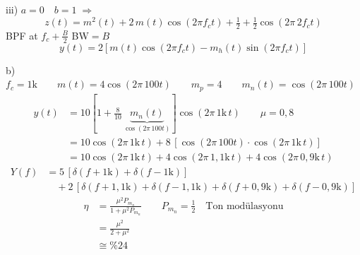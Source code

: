 \documentclass[11pt,a4paper]{article}
\begin{document}
\noindent iii) $a=0\quad b=1 \;\Rightarrow$
\[
z(t)=m^2(t)+2\,m(t)\cos(2\pi f_c t)+\tfrac12+\tfrac12\cos(2\pi\,2f_c t)
\]
BPF at $f_c+\tfrac{B}{2}$ \qquad BW$=B$
\[
y(t)=2\left[m(t)\cos(2\pi f_c t)-m_h(t)\sin(2\pi f_c t)\right]
\]

\noindent b) $f_c=1\mathrm{k}\qquad m(t)=4\cos(2\pi\,100t)\qquad m_p=4\qquad m_n(t)=\cos(2\pi\,100t)$
\begin{align*}
y(t) &= 10\left[1+\frac{8}{10}\,\underbrace{m_n(t)}_{\cos(2\pi\,100t)}\right]\cos(2\pi\,1\mathrm{k}\,t)\qquad \mu=0{,}8\\
 &= 10\cos(2\pi\,1\mathrm{k}\,t)+8\,[\cos(2\pi\,100t)\cdot\cos(2\pi\,1\mathrm{k}\,t)]\\
 &= 10\cos(2\pi\,1\mathrm{k}\,t)+4\cos(2\pi\,1{,}1\mathrm{k}\,t)+4\cos(2\pi\,0{,}9\mathrm{k}\,t)
\end{align*}
\begin{align*}
Y(f) &= 5\,[\delta(f+1\mathrm{k})+\delta(f-1\mathrm{k})]\\
 &\quad +2\,[\delta(f+1{,}1\mathrm{k})+\delta(f-1{,}1\mathrm{k})+\delta(f+0{,}9\mathrm{k})+\delta(f-0{,}9\mathrm{k})]
\end{align*}
\begin{align*}
\eta &= \frac{\mu^2 P_{m_n}}{1+\mu^2 P_{m_n}}\qquad P_{m_n}=\tfrac12\quad\text{Ton modülasyonu}\\
 &= \frac{\mu^2}{2+\mu^2}\\
 &\cong \%24
\end{align*}

\begin{center}
\end{center}
\end{document}
